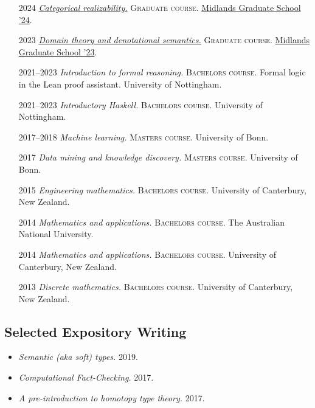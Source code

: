 \documentclass[12pt,a4paper]{article}
\providecommand{\tightlist}{%
  \setlength{\itemsep}{0pt}\setlength{\parskip}{0pt}}
\begin{document}
\begin{itemize}[leftmargin=7ex]
\tightlist
\item[2024]
  \emph{\href{https://github.com/tomdjong/MGS-categorical-realizability}{Categorical realizability.}}
  \textsc{Graduate course.}
  \href{https://www.cs.le.ac.uk/events/mgs2024/}{Midlands Graduate School '24}.
\item[2023]
  \emph{\href{https://github.com/tomdjong/MGS-domain-theory}{Domain theory and denotational semantics.}}
  \textsc{Graduate course.}
  \href{https://www.cs.bham.ac.uk/~mhe/events/MGS23}{Midlands Graduate School '23}.
\item[\small 2021--2023]
  \emph{Introduction to formal reasoning.}
  \textsc{Bachelors course.}
  Formal logic in the Lean proof assistant.
  University of Nottingham.
\item[\small 2021--2023]
  \emph{Introductory Haskell.}
  \textsc{Bachelors course.}
  University of Nottingham.
\item[\small 2017--2018]
  \emph{Machine learning.}
  \textsc{Masters course.}
  University of Bonn.
\item[2017]
  \emph{Data mining and knowledge discovery.}
  \textsc{Masters course.}
  University of Bonn.
\item[2015]
  \emph{Engineering mathematics.}
  \textsc{Bachelors course.}
  University of Canterbury, New Zealand.
\item[2014]
  \emph{Mathematics and applications.}
  \textsc{Bachelors course.}
  The Australian National University.
\item[2014]
  \emph{Mathematics and applications.}
  \textsc{Bachelors course.}
  University of Canterbury, New Zealand.
\item[2013]
  \emph{Discrete mathematics.}
  \textsc{Bachelors course.}
  University of Canterbury, New Zealand.
\end{itemize}

\subsection{Selected Expository Writing}

\begin{itemize}
\tightlist
\item
  \emph{Semantic (aka soft) types.}
  2019.\hspace{0.5ex}
\item
  \emph{Computational Fact-Checking.}
  2017.\hspace{0.5ex}
\item
  \emph{A pre-introduction to homotopy type theory.}
  2017.\hspace{0.5ex}
\end{itemize}
\end{document}
